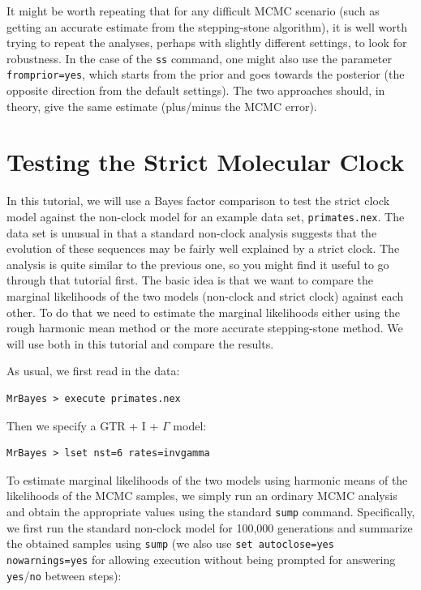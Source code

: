 \documentclass[12pt]{book}
\newcommand{\ttt}[1]{\texttt{#1}}
\begin{document}
It might be worth repeating that for any difficult MCMC scenario (such as getting an accurate
estimate from the stepping-stone algorithm), it is well worth trying to repeat the analyses,
perhaps with slightly different settings, to look for robustness. In the case of the \texttt{ss}
command, one might also use the parameter \texttt{fromprior=yes}, which starts from the prior and
goes towards the posterior (the opposite direction from the default settings). The two approaches
should, in theory, give the same estimate (plus/minus the MCMC error).

\section{Testing the Strict Molecular Clock}
\label{strictClock}

In this tutorial, we will use a Bayes factor comparison to test the strict clock model against the
non-clock model for an example data set, \ttt{primates.nex}. The data set is unusual in that a
standard non-clock analysis suggests that the evolution of these sequences may be fairly well
explained by a strict clock. The analysis is quite similar to the previous one, so you might find
it useful to go through that tutorial first. The basic idea is that we want to compare the marginal
likelihoods of the two models (non-clock and strict clock) against each other. To do that we need
to estimate the marginal likelihoods either using the rough harmonic mean method or the more
accurate stepping-stone method. We will use both in this tutorial and compare the results.

As usual, we first read in the data:

\begin{singlespacing}
\small
\begin{verbatim}
MrBayes > execute primates.nex
\end{verbatim}
\end{singlespacing}
\normalsize

Then we specify a GTR + I + $\Gamma$ model:

\begin{singlespacing}
\small
\begin{verbatim}
MrBayes > lset nst=6 rates=invgamma
\end{verbatim}
\end{singlespacing}
\normalsize

To estimate marginal likelihoods of the two models using harmonic means of the likelihoods of the
MCMC samples, we simply run an ordinary MCMC analysis and obtain the appropriate values using the
standard \ttt{sump} command. Specifically, we first run the standard non-clock model for 100,000
generations and summarize the obtained samples using \ttt{sump} (we also use \ttt{set autoclose=yes
nowarnings=yes} for allowing execution without being prompted for answering \ttt{yes}/\ttt{no}
between steps):
\end{document}
